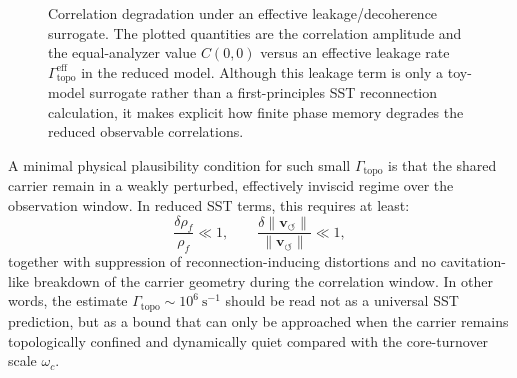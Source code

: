 \documentclass[11pt]{article}
\newcommand{\vnorm}{\lVert \mathbf{v}_{\!\boldsymbol{\circlearrowleft}}\rVert}
\begin{document}
        \begin{figure}[t]
            \centering
            \caption{Correlation degradation under an effective leakage/decoherence surrogate. The plotted quantities are the correlation amplitude and the equal-analyzer value \(C(0,0)\) versus an effective leakage rate \(\Gamma_{\mathrm{topo}}^{\mathrm{eff}}\) in the reduced model. Although this leakage term is only a toy-model surrogate rather than a first-principles SST reconnection calculation, it makes explicit how finite phase memory degrades the reduced observable correlations.}
            \label{fig:delay_phase_leakage_sweep}
        \end{figure}

        A minimal physical plausibility condition for such small \(\Gamma_{\mathrm{topo}}\) is that the shared carrier remain in a weakly perturbed, effectively inviscid regime over the observation window. In reduced SST terms, this requires at least:
        \begin{equation}
            \frac{\delta \rho_{\!f}}{\rho_{\!f}}\ll 1,
            \qquad
            \frac{\delta \vnorm}{\vnorm}\ll 1,
        \end{equation}
        together with suppression of reconnection-inducing distortions and no cavitation-like breakdown of the carrier geometry during the correlation window. In other words, the estimate \(\Gamma_{\mathrm{topo}}\sim 10^6~\mathrm{s^{-1}}\) should be read not as a universal SST prediction, but as a bound that can only be approached when the carrier remains topologically confined and dynamically quiet compared with the core-turnover scale \(\omega_c\).
\end{document}
